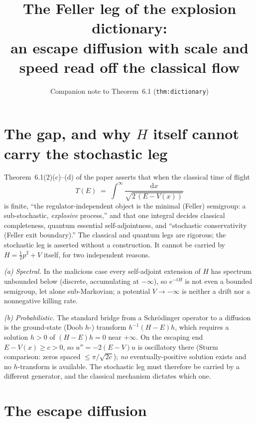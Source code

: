 \documentclass[11pt]{article}
\title{The Feller leg of the explosion dictionary:\\
an escape diffusion with scale and speed read off the classical flow}
\author{Companion note to Theorem~6.1 (\texttt{thm:dictionary})}
\date{}
\theoremstyle{remark}
\newcommand{\dd}{\mathrm{d}}
\begin{document}
\maketitle

\section*{The gap, and why $H$ itself cannot carry the stochastic leg}

Theorem~6.1(2)(c)--(d) of the paper asserts that when the classical time
of flight
\[
T(E)\;=\;\int^{\infty}\frac{\dd x}{\sqrt{2\,(E-V(x))}}
\]
is finite, ``the regulator-independent object is the minimal (Feller)
semigroup: a sub-stochastic, \emph{explosive} process,'' and that one
integral decides classical completeness, quantum essential
self-adjointness, and ``stochastic conservativity (Feller exit
boundary).''  The classical and quantum legs are rigorous; the
stochastic leg is asserted without a construction.  It cannot be carried
by $H=\tfrac12p^{2}+V$ itself, for two independent reasons.

\emph{(a) Spectral.}  In the malicious case every self-adjoint extension
of $H$ has spectrum unbounded below (discrete, accumulating at
$-\infty$), so $e^{-tH}$ is not even a bounded semigroup, let alone
sub-Markovian; a potential $V\to-\infty$ is neither a drift nor a
nonnegative killing rate.

\emph{(b) Probabilistic.}  The standard bridge from a Schr\"odinger
operator to a diffusion is the ground-state (Doob $h$-) transform
$h^{-1}(H-E)h$, which requires a solution $h>0$ of $(H-E)h=0$ near
$+\infty$.  On the escaping end $E-V(x)\ge c>0$, so $u''=-2(E-V)u$ is
oscillatory there (Sturm comparison: zeros spaced $\le\pi/\sqrt{2c}$);
\emph{no} eventually-positive solution exists and no $h$-transform is
available.  The stochastic leg must therefore be carried by a different
generator, and the classical mechanism dictates which one.

\section*{The escape diffusion}
\end{document}
